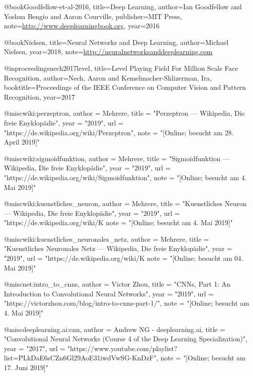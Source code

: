@book{Goodfellow-et-al-2016,
    title={Deep Learning},
    author={Ian Goodfellow and Yoshua Bengio and Aaron Courville},
    publisher={MIT Press},
    note={\url{http://www.deeplearningbook.org}},
    year={2016}
}

@book{Nielsen,
    title={Neural Networks and Deep Learning},
    author={Michael Nielsen},
    year={2018},
    note={\url{http://neuralnetworksanddeeplearning.com}}
}

@inproceedings{nech2017level,
    title={Level Playing Field For Million Scale Face Recognition},
    author={Nech, Aaron and Kemelmacher-Shlizerman, Ira},
    booktitle={Proceedings of the IEEE Conference on Computer Vision and Pattern Recognition},
    year={2017}
}

@misc{wiki:perzeptron,
  author = {{Mehrere}},
  title = "Perzeptron --- {W}ikipedia{,} Die freie Enyklopädie",
  year = "2019",
  url = "https://de.wikipedia.org/wiki/Perzeptron",
  note = "[Online; besucht am 28. April 2019]"
}

@misc{wiki:sigmoidfunktion,
  author = {{Mehrere}},
  title = "Sigmoidfunktion --- {W}ikipedia{,} Die freie Enyklopädie",
  year = "2019",
  url = "https://de.wikipedia.org/wiki/Sigmoidfunktion",
  note = "[Online; besucht am 4. Mai 2019]"
}

@misc{wiki:kuenstliches_neuron,
  author = {{Mehrere}},
  title = "Kuenstliches Neuron --- {W}ikipedia{,} Die freie Enyklopädie",
  year = "2019",
  url = "https://de.wikipedia.org/wiki/K%
  note = "[Online; besucht am 4. Mai 2019]"
}

@misc{wiki:kuenstliches_neuronales_netz,
  author = {{Mehrere}},
  title = "Kuenstliches Neuronales Netz --- {W}ikipedia{,} Die freie Enyklopädie",
  year = "2019",
  url = "https://de.wikipedia.org/wiki/K%
  note = "[Online; besucht am 04. Mai 2019]"
}

@misc{net:intro_to_cnns,
  author = {Victor Zhou},
  title = "CNNs, Part 1: An Introduction to Convolutional Neural Networks",
  year = "2019",
  url = "https://victorzhou.com/blog/intro-to-cnns-part-1/",
  note = "[Online; besucht am 4. Mai 2019]"
}

@misc{deeplearning.ai:cnn,
  author = {Andrew NG - deeplearning.ai},
  title = "Convolutional Neural Networks (Course 4 of the Deep Learning Specialization)",
  year = "2017",
  url = "https://www.youtube.com/playlist?list=PLkDaE6sCZn6Gl29AoE31iwdVwSG-KnDzF",
  note = "[Online; besucht am 17. Juni 2019]"
}

